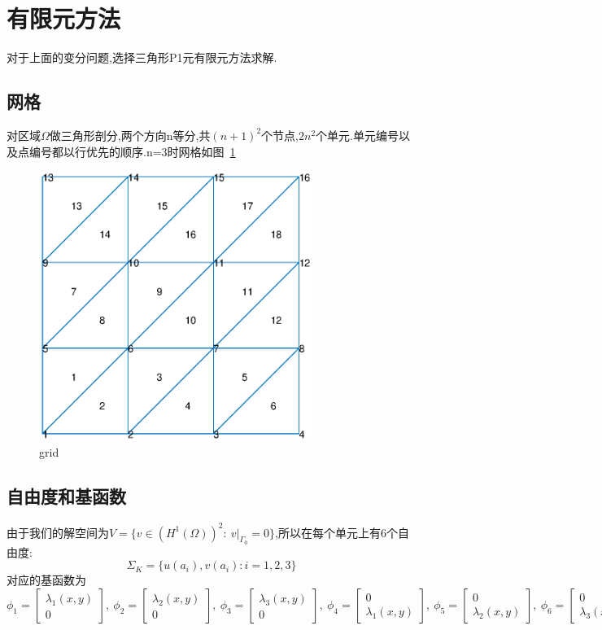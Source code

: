 \documentclass[UTF8]{ctexart}
\begin{document}
\section{有限元方法}
对于上面的变分问题,选择三角形P1元有限元方法求解.
\subsection{网格}
对区域$\Omega$做三角形剖分,两个方向n等分,共$(n+1)^2$个节点,$2n^2$个单元.单元编号以及点编号都以行优先的顺序.n=3时网格如图~\ref{grid}
\begin{figure}[htbp]
\centering\includegraphics[width=3.5in]{gird.eps}
\caption{grid}\label{grid}
\end{figure}
\subsection{自由度和基函数}
由于我们的解空间为$V=\{ v \in (H^1(\Omega)) ^2 :\  v|_{\Gamma_0}=0\}$,所以在每个单元上有6个自由度:
$$
\Sigma_K = \{u(a_i),v(a_i):i=1,2,3\}
$$
对应的基函数为
\begin{equation}
\phi_1 = \left[
    \begin{matrix}
    \lambda_1(x,y) \\
     0
  \end{matrix}\right]
  ,\ \phi_2 = \left[
      \begin{matrix}
    \lambda_2(x,y) \\
     0
  \end{matrix}\right]
  ,\ \phi_3 = \left[
      \begin{matrix}
    \lambda_3(x,y) \\
     0
  \end{matrix} \right]
  ,\ \phi_4 = \left[
      \begin{matrix}
    0 \\
     \lambda_1(x,y)
  \end{matrix} \right]
  ,\ \phi_5 = \left[
        \begin{matrix}
    0 \\
     \lambda_2(x,y)
  \end{matrix}
 \right]
  ,\ \phi_6 = \left[
        \begin{matrix}
    0 \\
     \lambda_3(x,y)
  \end{matrix}
 \right]
\end{equation}
\end{document}
